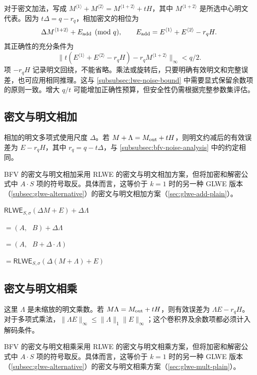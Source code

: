 对于密文加法，写成 $M^{\langle1\rangle}+M^{\langle2\rangle}=M^{\langle1+2\rangle}+tH$，其中 $M^{\langle1+2\rangle}$ 是所选中心明文代表。因为 $t\Delta=q-r_q$，相加密文的相位为
\[
\Delta M^{\langle1+2\rangle}+E_{\rm add}\pmod q,
\qquad E_{\rm add}=E^{\langle1\rangle}+E^{\langle2\rangle}-r_qH.
\]
其正确性的充分条件为
\[
\bigl\|t(E^{\langle1\rangle}+E^{\langle2\rangle}-r_qH)-r_qM^{\langle1+2\rangle}\bigr\|_\infty<q/2.
\]
项 $-r_qH$ 记录明文回绕，不能省略。乘法或旋转后，只要明确有效明文和完整误差，也可应用相同推理。这与 \autoref{subsubsec:lwe-noise-bound} 中需要显式保留余数项的原则一致。增大 $q/t$ 可能增加正确性预算，但安全性仍需根据完整参数集评估。

\subsection{密文与明文相加}
\label{subsec:bfv-add-plain}

相加的明文多项式使用尺度 $\Delta$。若 $M+\Lambda=M_{\rm out}+tH$，则明文约减后的有效误差为 $E-r_qH$，其中 $r_q=q-t\Delta$，与 \autoref{subsubsec:bfv-noise-analysis} 中的约定相同。

BFV 的密文与明文相加采用 RLWE 的密文与明文相加方案，但将加密和解密公式中 $A\cdot S$ 项的符号取反。具体而言，这等价于 $k = 1$ 时的另一种 GLWE 版本（\autoref{subsec:glwe-alternative}）的密文与明文相加方案（\autoref{sec:glwe-add-plain}）。


\begin{tcolorbox}[title={\textbf{\tboxlabel{\ref*{subsec:bfv-add-plain}} BFV 密文与明文相加}}]
$\textsf{RLWE}_{S, \sigma}(\Delta M + E) + \Delta\Lambda $

$=  (A, \text{ } B) + \Delta\Lambda$

$=  (A, \text{ } B + \Delta\cdot\Lambda)$

$= \textsf{RLWE}_{S, \sigma}(\Delta (M + \Lambda) + E)$
\end{tcolorbox}



\subsection{密文与明文相乘}
\label{subsec:bfv-mult-plain}

这里 $\Lambda$ 是未缩放的明文乘数。若 $M\Lambda=M_{\rm out}+tH$，则有效误差为 $\Lambda E-r_qH$。对于多项式乘法，$\|\Lambda E\|_\infty\leq\|\Lambda\|_1\|E\|_\infty$；这个卷积界及余数项都必须计入解码条件。


BFV 的密文与明文相乘采用 RLWE 的密文与明文相乘方案，但将加密和解密公式中 $A\cdot S$ 项的符号取反。具体而言，这等价于 $k = 1$ 时的另一种 GLWE 版本（\autoref{subsec:glwe-alternative}）的密文与明文相乘方案（\autoref{sec:glwe-mult-plain}）。


